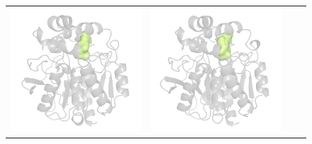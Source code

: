 \documentclass[usletter, 10pt, conference]{svjour3}      %
\begin{document}
\begin{figure}
{\begin{tabular}{cccc}
\includegraphics[width=\ee\textwidth]{fig/video-0699} &
\includegraphics[width=\ee\textwidth]{fig/video-0700} &

\end{tabular}}
\end{figure}
\end{document}
